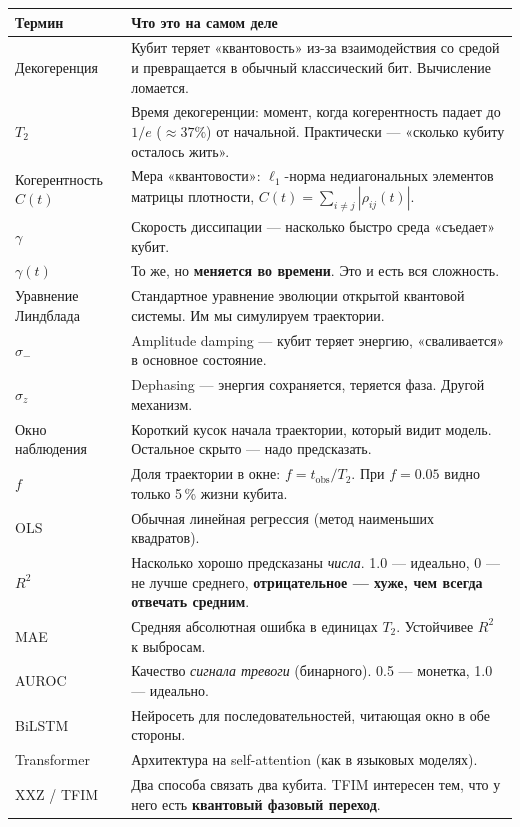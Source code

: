 \documentclass[12pt,a4paper]{article}
\begin{document}
\begin{longtable}{@{}p{3.6cm}p{11cm}@{}}
\toprule
\textbf{Термин} & \textbf{Что это на самом деле} \\
\midrule
\endhead
Декогеренция & Кубит теряет «квантовость» из-за взаимодействия со средой и
  превращается в обычный классический бит. Вычисление ломается. \\
$T_2$ & Время декогеренции: момент, когда когерентность падает до $1/e$
  ($\approx 37\%$) от начальной. Практически — «сколько кубиту осталось жить». \\
Когерентность $C(t)$ & Мера «квантовости»: $\ell_1$-норма недиагональных
  элементов матрицы плотности, $C(t)=\sum_{i\neq j}|\rho_{ij}(t)|$. \\
$\gamma$ & Скорость диссипации — насколько быстро среда «съедает» кубит. \\
$\gamma(t)$ & То же, но \textbf{меняется во времени}. Это и есть вся сложность. \\
Уравнение Линдблада & Стандартное уравнение эволюции открытой квантовой
  системы. Им мы симулируем траектории. \\
$\sigma_-$ & Amplitude damping — кубит теряет энергию, «сваливается» в основное
  состояние. \\
$\sigma_z$ & Dephasing — энергия сохраняется, теряется фаза. Другой механизм. \\
Окно наблюдения & Короткий кусок начала траектории, который видит модель.
  Остальное скрыто — надо предсказать. \\
$f$ & Доля траектории в окне: $f=t_{\mathrm{obs}}/T_2$. При $f=0.05$ видно
  только 5\,\% жизни кубита. \\
OLS & Обычная линейная регрессия (метод наименьших квадратов). \\
$R^2$ & Насколько хорошо предсказаны \emph{числа}. 1.0 — идеально, 0 — не лучше
  среднего, \textbf{отрицательное — хуже, чем всегда отвечать средним}. \\
MAE & Средняя абсолютная ошибка в единицах $T_2$. Устойчивее $R^2$ к выбросам. \\
AUROC & Качество \emph{сигнала тревоги} (бинарного). 0.5 — монетка, 1.0 —
  идеально. \\
BiLSTM & Нейросеть для последовательностей, читающая окно в обе стороны. \\
Transformer & Архитектура на self-attention (как в языковых моделях). \\
XXZ / TFIM & Два способа связать два кубита. TFIM интересен тем, что у него
  есть \textbf{квантовый фазовый переход}. \\
\bottomrule
\end{longtable}
\end{document}
